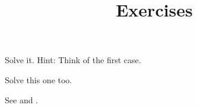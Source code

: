 \documentclass{article}
\begin{document}
\title{Exercises}
\author{}
\date{}
\maketitle
\begin{exercise}[A title]\flmLabels{\label{ref1}}
Solve it. Hint: Think of the first case.
\end{exercise}

\begin{exercise}\flmLabels{\label{ref2}}
Solve this one too.
\end{exercise}

See  and .
\end{document}
